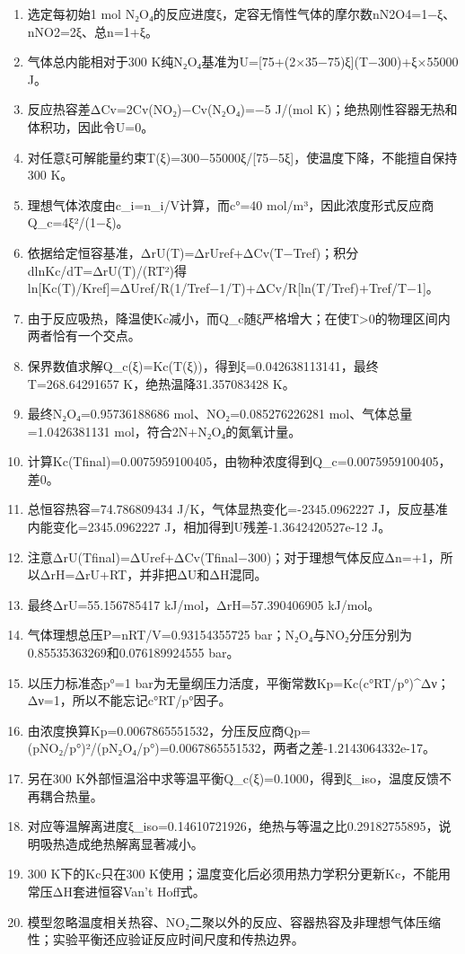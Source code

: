\documentclass[UTF8,11pt,a4paper]{ctexart}
\begin{document}
\begin{enumerate}
\item 选定每初始1 mol N₂O₄的反应进度ξ，定容无惰性气体的摩尔数nN2O4=1−ξ、nNO2=2ξ、总n=1+ξ。
\item 气体总内能相对于300 K纯N₂O₄基准为U=[75+(2×35−75)ξ](T−300)+ξ×55000 J。
\item 反应热容差ΔCv=2Cv(NO₂)−Cv(N₂O₄)=−5 J/(mol K)；绝热刚性容器无热和体积功，因此令U=0。
\item 对任意ξ可解能量约束T(ξ)=300−55000ξ/[75−5ξ]，使温度下降，不能擅自保持300 K。
\item 理想气体浓度由c\_i=n\_i/V计算，而c°=40 mol/m³，因此浓度形式反应商Q\_c=4ξ²/(1−ξ)。
\item 依据给定恒容基准，ΔrU(T)=ΔrUref+ΔCv(T−Tref)；积分dlnKc/dT=ΔrU(T)/(RT²)得ln[Kc(T)/Kref]=ΔUref/R(1/Tref−1/T)+ΔCv/R[ln(T/Tref)+Tref/T−1]。
\item 由于反应吸热，降温使Kc减小，而Q\_c随ξ严格增大；在使T>0的物理区间内两者恰有一个交点。
\item 保界数值求解Q\_c(ξ)=Kc(T(ξ))，得到ξ=0.042638113141，最终T=268.64291657 K，绝热温降31.357083428 K。
\item 最终N₂O₄=0.95736188686 mol、NO₂=0.085276226281 mol、气体总量=1.0426381131 mol，符合2N+N₂O₄的氮氧计量。
\item 计算Kc(Tfinal)=0.0075959100405，由物种浓度得到Q\_c=0.0075959100405，差0。
\item 总恒容热容=74.786809434 J/K，气体显热变化=-2345.0962227 J，反应基准内能变化=2345.0962227 J，相加得到U残差-1.3642420527e-12 J。
\item 注意ΔrU(Tfinal)=ΔUref+ΔCv(Tfinal−300)；对于理想气体反应Δn=+1，所以ΔrH=ΔrU+RT，并非把ΔU和ΔH混同。
\item 最终ΔrU=55.156785417 kJ/mol，ΔrH=57.390406905 kJ/mol。
\item 气体理想总压P=nRT/V=0.93154355725 bar；N₂O₄与NO₂分压分别为0.85535363269和0.076189924555 bar。
\item 以压力标准态p°=1 bar为无量纲压力活度，平衡常数Kp=Kc(c°RT/p°)\textasciicircum{}Δν；Δν=1，所以不能忘记c°RT/p°因子。
\item 由浓度换算Kp=0.0067865551532，分压反应商Qp=(pNO₂/p°)²/(pN₂O₄/p°)=0.0067865551532，两者之差-1.2143064332e-17。
\item 另在300 K外部恒温浴中求等温平衡Q\_c(ξ)=0.1000，得到ξ\_iso，温度反馈不再耦合热量。
\item 对应等温解离进度ξ\_iso=0.14610721926，绝热与等温之比0.29182755895，说明吸热造成绝热解离显著减小。
\item 300 K下的Kc只在300 K使用；温度变化后必须用热力学积分更新Kc，不能用常压ΔH套进恒容Van’t Hoff式。
\item 模型忽略温度相关热容、NO₂二聚以外的反应、容器热容及非理想气体压缩性；实验平衡还应验证反应时间尺度和传热边界。
\end{enumerate}
\end{document}

